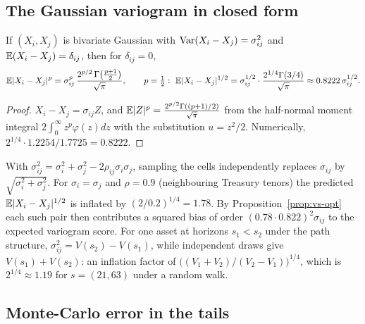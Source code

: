 \subsection{The Gaussian variogram in closed form}

\begin{proposition}\label{prop:gvs}
If $(X_i,X_j)$ is bivariate Gaussian with $\operatorname{Var}(X_i-X_j)=\sigma^2_{ij}$ and $\mathbb{E}(X_i-X_j)=\delta_{ij}$, then for $\delta_{ij}=0$,
\begin{equation}
  \E|X_i-X_j|^p=\sigma_{ij}^p\,\frac{2^{p/2}\,\Gamma\bigl(\frac{p+1}{2}\bigr)}{\sqrt\pi},\qquad
  p=\tfrac12:\ \E|X_i-X_j|^{1/2}=\sigma_{ij}^{1/2}\cdot\frac{2^{1/4}\Gamma(3/4)}{\sqrt\pi}\approx0.8222\,\sigma_{ij}^{1/2}.
\end{equation}
\end{proposition}
\begin{proof}
$X_i-X_j=\sigma_{ij}Z$, and $\mathbb{E}|Z|^p=\frac{2^{p/2}\Gamma((p+1)/2)}{\sqrt\pi}$ from the half-normal moment integral
$2\int_0^\infty z^p\varphi(z)dz$ with the substitution $u=z^2/2$. Numerically, $2^{1/4}\cdot1.2254/1.7725=0.8222$.
\end{proof}

\begin{corollary}
With $\sigma_{ij}^2=\sigma_i^2+\sigma_j^2-2\rho_{ij}\sigma_i\sigma_j$, sampling the cells independently replaces $\sigma_{ij}$ by
$\sqrt{\sigma_i^2+\sigma_j^2}$. For $\sigma_i=\sigma_j$ and $\rho=0.9$ (neighbouring Treasury tenors) the predicted $\mathbb{E}|X_i-X_j|^{1/2}$ is inflated by
$(2/0.2)^{1/4}=1.78$. By Proposition~\ref{prop:vs-opt} each such pair then contributes a squared bias of order $(0.78\cdot0.822)^2\sigma_{ij}$ to the
expected variogram score. For one asset at horizons $s_1<s_2$ under the path structure, $\sigma^2_{ij}=V(s_2)-V(s_1)$, while independent draws give
$V(s_1)+V(s_2)$: an inflation factor of $\bigl((V_1+V_2)/(V_2-V_1)\bigr)^{1/4}$, which is $2^{1/4}\approx1.19$ for $s=(21,63)$ under a random walk.
\end{corollary}

\subsection{Monte-Carlo error in the tails}


